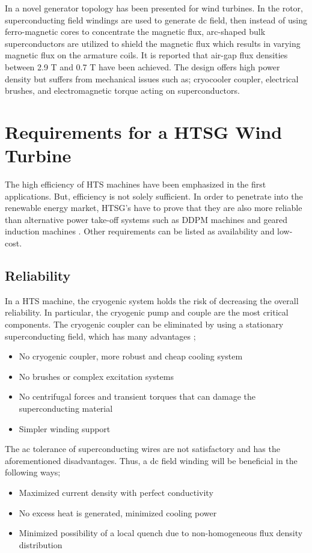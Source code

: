 \documentclass[final,peerreview,onecolumn]{IEEEtran}
\begin{document}
In \cite{Ohsaki2009} a novel generator topology has been presented for wind turbines. In the rotor, superconducting field windings are used to generate dc field, then instead of using ferro-magnetic cores to concentrate the magnetic flux, arc-shaped bulk superconductors are utilized to shield the magnetic flux which results in varying magnetic flux on the armature coils. It is reported that air-gap flux densities between 2.9 T and 0.7 T have been achieved. The design offers high power density but suffers from mechanical issues such as; cryocooler coupler, electrical brushes, and electromagnetic torque acting on superconductors.

\section{Requirements for a HTSG Wind Turbine}
The high efficiency of HTS machines have been emphasized in the first applications. But, efficiency is not solely sufficient.  In order to penetrate into the renewable energy market, HTSG's have to prove that they are also more reliable than alternative power take-off systems such as DDPM machines and geared induction machines \cite{Abrahamsen2010}. Other requirements can be listed as  availability and low-cost.

\subsection{Reliability}
In a HTS machine, the cryogenic system holds the risk of decreasing the overall reliability. In particular, the cryogenic pump and couple are the most critical components. The cryogenic coupler can be eliminated by using a stationary superconducting field, which has many advantages \cite{Gieras2008a};
\begin{itemize}
\item No cryogenic coupler, more robust and cheap cooling system
\item No brushes or complex excitation systems
\item No centrifugal forces and transient torques that can damage the superconducting material
\item Simpler winding support
\end{itemize}

The ac tolerance of superconducting wires are not satisfactory \cite{Bray2009} and has the aforementioned disadvantages. Thus, a dc field winding will be beneficial in the following ways;
\begin{itemize}
\item Maximized current density with perfect conductivity
\item No excess heat is generated, minimized cooling power
\item Minimized possibility of a local quench due to non-homogeneous flux density distribution
\end{itemize}
\end{document}
